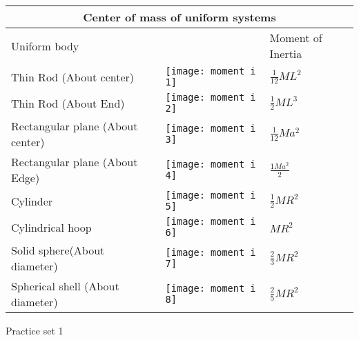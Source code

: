 \begin{table}[H]
	\centering
	\renewcommand*{\arraystretch}{1.5}
	\begin{tabular}{|p{4cm}|p{6cm}|p{3cm}|}
		\hline
		\multicolumn{3}{|c|}{\textbf{Center of mass of uniform systems}}\\\hline\hline
		\rowcolor{ocrel}Uniform body& & Moment of Inertia\\\hline
		Thin Rod (About center)&
		\texttt{[image: moment i 1]}
		&\textbf{$\frac{1}{12}ML^{2}$}   \\\hline 
		Thin Rod (About End)& 			\texttt{[image: moment i 2]} & \textbf{$\frac{1}{2}ML^{3}$}   \\\hline 
		Rectangular plane (About center)& \texttt{[image:  moment i 3]} &\textbf{$\frac{1}{12}Ma^{2}$}   \\\hline 
		Rectangular plane (About Edge)&	\texttt{[image:  moment i 4]} & \textbf{$\frac{1Ma^{2}}{2}$}   \\\hline 
		Cylinder& \texttt{[image: moment i 5]} &\textbf{$\frac{1}{2}MR^{2}$}   \\\hline
		Cylindrical hoop& \texttt{[image: moment i 6]} &\textbf{$MR^{2}$}   \\\hline
		Solid sphere(About diameter)& \texttt{[image: moment i 7]} &\textbf{$\frac{2}{3}MR^{2}$}   \\\hline
		Spherical shell (About diameter)& \texttt{[image: moment i 8]} &\textbf{$\frac{2}{5} MR^{2}$}   \\\hline
	\end{tabular}
\end{table}
\newpage
\begin{abox}
Practice set 1
\end{abox}
